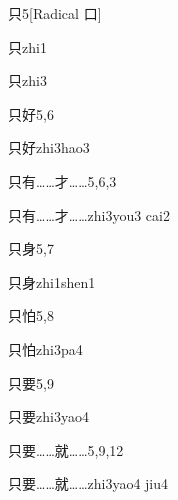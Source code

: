 \begin{entry}{只}{5}[Radical 口]
  \begin{phonetics}{只}{zhi1}
  \end{phonetics}
  \begin{phonetics}{只}{zhi3}
  \end{phonetics}
\end{entry}

\begin{entry}{只好}{5,6}
  \begin{phonetics}{只好}{zhi3hao3}
  \end{phonetics}
\end{entry}

\begin{entry}{只有……才……}{5,6,3}
  \begin{phonetics}{只有……才……}{zhi3you3 cai2}
  \end{phonetics}
\end{entry}

\begin{entry}{只身}{5,7}
  \begin{phonetics}{只身}{zhi1shen1}
  \end{phonetics}
\end{entry}

\begin{entry}{只怕}{5,8}
  \begin{phonetics}{只怕}{zhi3pa4}
  \end{phonetics}
\end{entry}

\begin{entry}{只要}{5,9}
  \begin{phonetics}{只要}{zhi3yao4}
  \end{phonetics}
\end{entry}

\begin{entry}{只要……就……}{5,9,12}
  \begin{phonetics}{只要……就……}{zhi3yao4 jiu4}
  \end{phonetics}
\end{entry}

